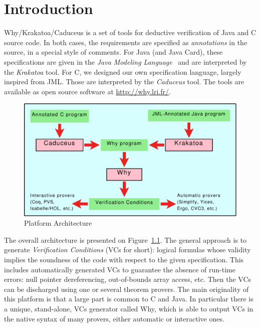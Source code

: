 \documentclass[a4paper,11pt,twoside,openright]{report}
\begin{document}
\sloppy
{}



\tableofcontents

\chapter{Introduction}

Why/Krakatoa/Caduceus is a set of tools for deductive verification of
Java and C source code. In both cases, the requirements are specified
as \emph{annotations} in the source, in a special style of comments.
For Java (and Java Card), these specifications are given in the
\emph{Java Modeling Language}~\cite{Burdy04} and are interpreted by
the \emph{Krakatoa} tool. For C, we designed our own specification
language, largely inspired from JML. Those are interpreted by the
\emph{Caduceus} tool. The tools are available as open source software
at \url{http://why.lri.fr/}. 

\begin{figure}
\begin{center}
\includegraphics[width=\textwidth]{platform2.pdf}
\end{center}
\caption{Platform Architecture\label{fig:arch}}
\end{figure}

The overall architecture is presented on Figure~\ref{fig:arch}. The
general approach is to generate \emph{Verification Conditions} (VCs
for short): logical formulas whose validity implies the soundness of
the code with respect to the given specification.  This includes
automatically generated VCs to guarantee the absence of run-time
errors: null pointer dereferencing, out-of-bounds array access, etc.
Then the VCs can be discharged using one or several theorem provers.
The main originality of this platform is that a large part is common
to C and Java. In particular there is a unique, stand-alone, VCs
generator called Why, which is able to output VCs in the native syntax
of many provers, either automatic or interactive ones.
\end{document}
